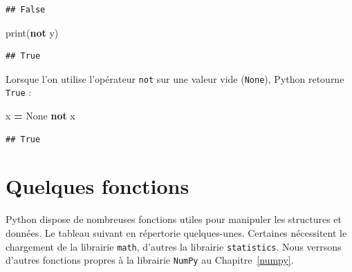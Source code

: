 \documentclass[
  12pt,
]{book}
\newenvironment{Shaded}{\begin{snugshade}}{\end{snugshade}}
\newcommand{\BuiltInTok}[1]{#1}
\newcommand{\KeywordTok}[1]{\textcolor[rgb]{0.13,0.29,0.53}{\textbf{#1}}}
\newcommand{\NormalTok}[1]{#1}
\newcommand{\OperatorTok}[1]{\textcolor[rgb]{0.81,0.36,0.00}{\textbf{#1}}}
\newcommand{\VariableTok}[1]{\textcolor[rgb]{0.00,0.00,0.00}{#1}}
\numberwithin{equation}{section}
\numberwithin{countremarque}{section}
\begin{document}
\begin{lstlisting}
## False
\end{lstlisting}

\begin{Shaded}
\begin{Highlighting}[]
\BuiltInTok{print}\NormalTok{(}\KeywordTok{not}\NormalTok{ y)}
\end{Highlighting}
\end{Shaded}

\begin{lstlisting}
## True
\end{lstlisting}

Lorsque l'on utilise l'opérateur \texttt{not} sur une valeur vide (\texttt{None}), Python retourne \texttt{True} :

\begin{Shaded}
\begin{Highlighting}[]
\NormalTok{x }\OperatorTok{=} \VariableTok{None}
\KeywordTok{not}\NormalTok{ x}
\end{Highlighting}
\end{Shaded}

\begin{lstlisting}
## True
\end{lstlisting}

\section{Quelques fonctions}\label{quelques-fonctions}

Python dispose de nombreuses fonctions utiles pour manipuler les structures et données. Le tableau suivant en répertorie quelques-unes. Certaines nécessitent le chargement de la librairie \texttt{math}, d'autres la librairie \texttt{statistics}. Nous verrsons d'autres fonctions propres à la librairie \texttt{NumPy} au Chapitre~\ref{numpy}.
\end{document}

